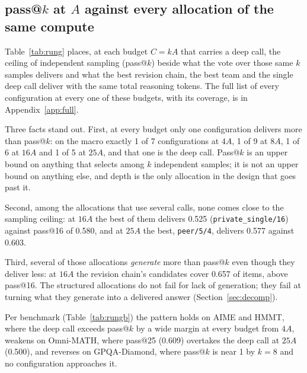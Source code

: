 \documentclass[11pt]{article}
\begin{document}
\subsection{pass@\texorpdfstring{$k$}{k} at \texorpdfstring{$A$}{A} against every allocation of the same compute}
\label{sec:passk}

Table~\ref{tab:rung} places, at each budget $C = kA$ that carries a deep call, the ceiling of independent
sampling (pass@$k$) beside what the vote over those same $k$ samples delivers and what the best revision
chain, the best team and the single deep call deliver with the same total reasoning tokens. The full list
of every configuration at every one of these budgets, with its coverage, is in Appendix~\ref{app:full}.

\begin{table}[htbp]
\centering
\small

\caption{Macro accuracy at equal realized compute $C = kA$. pass@$k$ is the generation ceiling of $k$
independent 1024-token samples; every other column is delivered accuracy (coverage columns are the share of
items on which the configuration's own candidates, over all its rounds, contained a correct answer).}
\label{tab:rung}
\end{table}

Three facts stand out. First, at every budget only one configuration delivers more than pass@$k$: on the
macro exactly 1 of 7 configurations at
$4A$, 1 of 9 at $8A$,
1 of 6 at $16A$ and
1 of 5 at $25A$, and that one is the
deep call. Pass@$k$ is an upper bound on anything that selects among $k$ independent samples; it is not an
upper bound on anything else, and depth is the only allocation in the design that goes past it.

Second, among the allocations that use several calls, none comes close to the sampling ceiling: at $16A$ the
best of them delivers 0.525 (\texttt{private\_single/16})
against pass@16 of 0.580, and at $25A$ the best,
\texttt{peer/5/4}, delivers 0.577 against
0.603.

Third, several of those allocations \emph{generate} more than pass@$k$ even though they deliver less: at
$16A$ the revision chain's candidates cover 0.657 of items, above
pass@16. The structured allocations do not fail for lack of generation; they fail at turning what they
generate into a delivered answer (Section~\ref{sec:decomp}).

Per benchmark (Table~\ref{tab:rungb}) the pattern holds on AIME and HMMT, where the deep call exceeds pass@$k$
by a wide margin at every budget from $4A$, weakens on Omni-MATH, where pass@25 (0.609)
overtakes the deep call at $25A$ (0.500), and reverses on GPQA-Diamond, where
pass@$k$ is near 1 by $k=8$ and no configuration approaches it.
\end{document}
